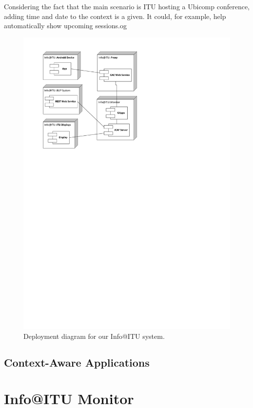 \documentclass{ubicomp2011}
\begin{document}
Considering the fact that the main scenario is ITU hosting a Ubicomp conference, adding time and date to the context is a given. It could, for example, help automatically show upcoming sessions.og

\begin{figure}[t]
\begin{center}
\includegraphics[width=0.90\columnwidth]{deployment-diagram.pdf}
\end{center}
\caption{Deployment diagram for our Info@ITU system.}
\label{fig:deployment-diagram}
\end{figure}
\subsection{Context-Aware Applications}

\section{Info@ITU Monitor}
\end{document}
